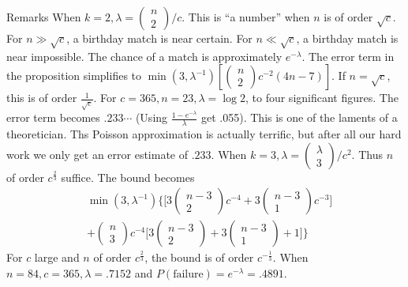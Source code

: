 \documentclass[12pt]{article}
\begin{document}
Remarks When $k = 2, \lambda = \left(\begin{array}{c}
n\\
2\end{array}\right)/c$. This is ``a number'' when $n$ is of order $\sqrt{c}$. For $n \gg \sqrt{c}$, a birthday match is near certain. For $n \ll \sqrt{c}$, a birthday match is near impossible. The chance of a match is approximately $e^{-\lambda}$. The error term in the proposition simplifies to $\min(3, \lambda^{-1})\left[\left(\begin{array}{c}
n\\
2\end{array}\right)c^{-2}(4n - 7)\right]$. If $n = \sqrt{c}$, this is of order $\frac{1}{\sqrt{c}}$. For $c = 365, n = 23, \lambda = \log 2$, to four significant figures. The error term becomes $.233\cdots$ (Using $\frac{1 - e^{-\lambda}}{\lambda}$ get .055). This is one of the laments of a theoretician. Ths Poisson approximation is actually terrific, but after all our hard work we only get an error estimate of $.233$. When $k = 3, \lambda = \left(\begin{array}{c}
\lambda\\
3\end{array}\right)/c^2$. Thus $n$ of order $c^{\frac{2}{3}}$ suffice. The bound becomes
\begin{align}
	&\min(3, \lambda^{-1})\big\{\big[3\left(\begin{array}{c}
n - 3\\
2\end{array}\right)c^{-4}
+ 3\left(\begin{array}{c}
n - 3\\
1\end{array}\right)c^{-3}\big] \nonumber\\
&+ \left(\begin{array}{c}
n\\
3\end{array}\right)c^{-4}\big[3\left(\begin{array}{c}
			n - 3\\
	2\end{array}\right) + 3\left(\begin{array}{c}
n - 3\\
1\end{array}\right) + 1\big]\big\}\nonumber
\end{align}
For $c$ large and $n$ of order $c^{\frac{2}{3}}$, the bound is of order $c^{-\frac{1}{3}}$. When $n = 84, c = 365, \lambda = .7152$ and $P(\text{failure}) = e^{-\lambda} = .4891$.\\
\end{document}
